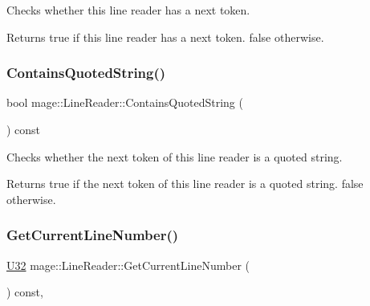 Checks whether this line reader has a next token.

\begin{DoxyReturn}{Returns}
{\ttfamily true} if this line reader has a next token. {\ttfamily false} otherwise. 
\end{DoxyReturn}
\mbox{\label{classmage_1_1_line_reader_a99b4fa47fc341ad4fda112ea9505efcb}} 
\subsubsection{\texorpdfstring{Contains\+Quoted\+String()}{ContainsQuotedString()}}
{\footnotesize\ttfamily bool mage\+::\+Line\+Reader\+::\+Contains\+Quoted\+String (\begin{DoxyParamCaption}{ }\end{DoxyParamCaption}) const\hspace{0.3cm}{\ttfamily [protected]}}

Checks whether the next token of this line reader is a quoted string.

\begin{DoxyReturn}{Returns}
{\ttfamily true} if the next token of this line reader is a quoted string. {\ttfamily false} otherwise. 
\end{DoxyReturn}
\mbox{\label{classmage_1_1_line_reader_aa0ed768e2799b74f2341c56fc6ac4969}} 
\subsubsection{\texorpdfstring{Get\+Current\+Line\+Number()}{GetCurrentLineNumber()}}
{\footnotesize\ttfamily \mbox{\hyperlink{namespacemage_a41c104c036fba3756a74e19f793eeaa1}{U32}} mage\+::\+Line\+Reader\+::\+Get\+Current\+Line\+Number (\begin{DoxyParamCaption}{ }\end{DoxyParamCaption}) const\hspace{0.3cm}{\ttfamily [protected]}, {\ttfamily [noexcept]}}

